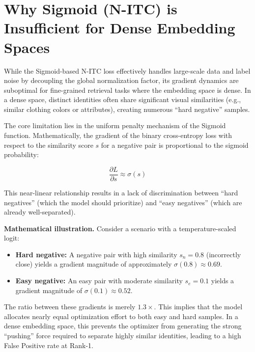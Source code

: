 \documentclass[../main.tex]{subfiles}
\begin{document}
\section{Why Sigmoid (N-ITC) is Insufficient for Dense Embedding Spaces}

\vspace{0.5cm}

While the Sigmoid-based N-ITC loss effectively handles large-scale data and label noise by decoupling the global normalization factor, its gradient dynamics are suboptimal for fine-grained retrieval tasks where the embedding space is dense. In a dense space, distinct identities often share significant visual similarities (e.g., similar clothing colors or attributes), creating numerous ``hard negative'' samples.

\noindent The core limitation lies in the uniform penalty mechanism of the Sigmoid function. Mathematically, the gradient of the binary cross-entropy loss with respect to the similarity score $s$ for a negative pair is proportional to the sigmoid probability:

\begin{equation*}
    \frac{\partial L}{\partial s} \approx \sigma(s)
\end{equation*}

\noindent This near-linear relationship results in a lack of discrimination between ``hard negatives'' (which the model should prioritize) and ``easy negatives'' (which are already well-separated).

\noindent \textbf{Mathematical illustration.} Consider a scenario with a temperature-scaled logit:

\begin{itemize}
    \item \textbf{Hard negative:} A negative pair with high similarity $s_n = 0.8$ (incorrectly close) yields a gradient magnitude of approximately $\sigma(0.8) \approx 0.69$.
    \item \textbf{Easy negative:} An easy pair with moderate similarity $s_e = 0.1$ yields a gradient magnitude of $\sigma(0.1) \approx 0.52$.
\end{itemize}

\noindent The ratio between these gradients is merely $1.3\times$. This implies that the model allocates nearly equal optimization effort to both easy and hard samples. In a dense embedding space, this prevents the optimizer from generating the strong ``pushing'' force required to separate highly similar identities, leading to a high False Positive rate at Rank-1.
\end{document}
